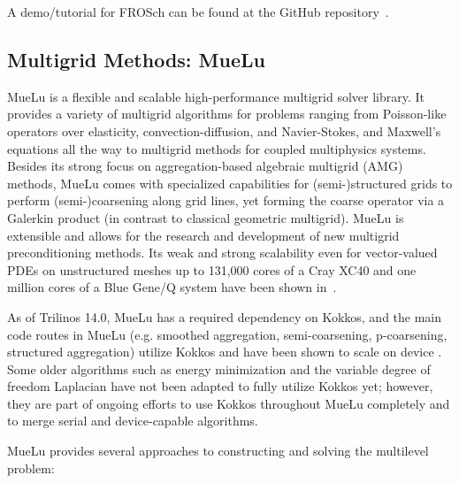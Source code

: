 A demo/tutorial for FROSch can be found at the GitHub repository~\cite{frosch_demo}.

\subsection{Multigrid Methods: MueLu}

MueLu is a flexible and scalable high-performance multigrid solver library.
It provides a variety of multigrid algorithms for problems ranging from Poisson-like operators over elasticity, convection-diffusion, and Navier-Stokes, and Maxwell’s equations
all the way to multigrid methods for coupled multiphysics systems.
Besides its strong focus on aggregation-based algebraic multigrid (AMG) methods,
MueLu comes with specialized capabilities for (semi-)structured grids to perform (semi-)coarsening along grid lines,
yet forming the coarse operator via a Galerkin product (in contrast to classical geometric multigrid).
MueLu is extensible and allows for the research and development of new multigrid preconditioning methods.
Its weak and strong scalability even for vector-valued PDEs on unstructured meshes
up to 131,000 cores of a Cray XC40 and one million cores of a Blue Gene/Q system have been shown in~\cite{Lin2017a,Thomas2019a}.

As of Trilinos 14.0, MueLu has a required dependency on Kokkos,
and the main code routes in MueLu (e.g. smoothed aggregation, semi-coarsening, p-coarsening, structured aggregation)
utilize Kokkos and have been shown to scale on device .
Some older algorithms such as energy minimization and the variable degree of freedom Laplacian have not been adapted to fully utilize Kokkos yet;
however, they are part of ongoing efforts to use Kokkos throughout MueLu completely and to merge serial and device-capable algorithms.

MueLu provides several approaches to constructing and solving the multilevel problem:

